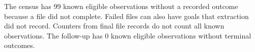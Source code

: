 The census has 99 known eligible observations without a recorded outcome because a file did not complete. Failed files can also have goals that extraction did not record. Counters from final file records do not count all known observations. The follow-up has 0 known eligible observations without terminal outcomes.







